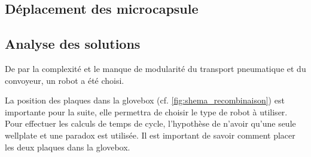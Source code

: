 \subsection{Déplacement des microcapsule}


\subsection{Analyse des solutions}
De par la complexité et le manque de modularité du transport pneumatique et du convoyeur, un robot a été choisi.

La position des plaques dans la \gls{glovebox} (cf. \autoref{fig:shema_recombinaison}) est importante pour la suite, elle permettra de choisir le type de robot à utiliser. Pour effectuer les calculs de temps de cycle, l'hypothèse de n'avoir qu'une seule \gls{wellplate} et une \gls{paradox} est utilisée.
Il est important de savoir comment placer les deux plaques dans la \gls{glovebox}.
